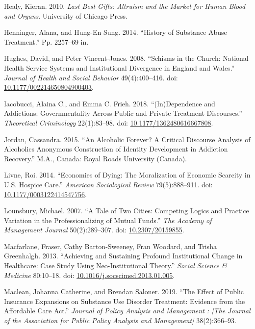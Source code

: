 \documentclass[
  12pt,
]{article}
\begin{document}
\leavevmode\hypertarget{ref-healy2010}{}%
Healy, Kieran. 2010. \emph{Last Best Gifts: Altruism and the Market for Human Blood and Organs}. University of Chicago Press.

\leavevmode\hypertarget{ref-henninger2014}{}%
Henninger, Alana, and Hung-En Sung. 2014. ``History of Substance Abuse Treatment.'' Pp. 2257--69 in.

\leavevmode\hypertarget{ref-hughes2008}{}%
Hughes, David, and Peter Vincent-Jones. 2008. ``Schisms in the Church: National Health Service Systems and Institutional Divergence in England and Wales.'' \emph{Journal of Health and Social Behavior} 49(4):400--416. doi: \href{https://doi.org/10.1177/002214650804900403}{10.1177/002214650804900403}.

\leavevmode\hypertarget{ref-iacobucci2018}{}%
Iacobucci, Alaina C., and Emma C. Frieh. 2018. ``(In)Dependence and Addictions: Governmentality Across Public and Private Treatment Discourses.'' \emph{Theoretical Criminology} 22(1):83--98. doi: \href{https://doi.org/10.1177/1362480616667808}{10.1177/1362480616667808}.

\leavevmode\hypertarget{ref-jordan2015}{}%
Jordan, Cassandra. 2015. ``An Alcoholic Forever? A Critical Discourse Analysis of Alcoholics Anonymous Construction of Identity Development in Addiction Recovery.'' M.A., Canada: Royal Roads University (Canada).

\leavevmode\hypertarget{ref-livne2014}{}%
Livne, Roi. 2014. ``Economies of Dying: The Moralization of Economic Scarcity in U.S. Hospice Care.'' \emph{American Sociological Review} 79(5):888--911. doi: \href{https://doi.org/10.1177/0003122414547756}{10.1177/0003122414547756}.

\leavevmode\hypertarget{ref-lounsbury2007}{}%
Lounsbury, Michael. 2007. ``A Tale of Two Cities: Competing Logics and Practice Variation in the Professionalizing of Mutual Funds.'' \emph{The Academy of Management Journal} 50(2):289--307. doi: \href{https://doi.org/10.2307/20159855}{10.2307/20159855}.

\leavevmode\hypertarget{ref-macfarlane2013}{}%
Macfarlane, Fraser, Cathy Barton-Sweeney, Fran Woodard, and Trisha Greenhalgh. 2013. ``Achieving and Sustaining Profound Institutional Change in Healthcare: Case Study Using Neo-Institutional Theory.'' \emph{Social Science \& Medicine} 80:10--18. doi: \href{https://doi.org/10.1016/j.socscimed.2013.01.005}{10.1016/j.socscimed.2013.01.005}.

\leavevmode\hypertarget{ref-maclean2019}{}%
Maclean, Johanna Catherine, and Brendan Saloner. 2019. ``The Effect of Public Insurance Expansions on Substance Use Disorder Treatment: Evidence from the Affordable Care Act.'' \emph{Journal of Policy Analysis and Management : {[}The Journal of the Association for Public Policy Analysis and Management{]}} 38(2):366--93.
\end{document}
